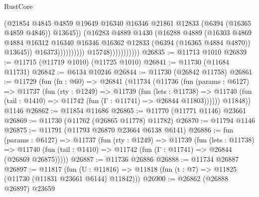 \begin{lexlean}{RustCore}
\begin{coremodule}
                                              (@21854
                                                @4845
                                                @4859
                                                @19649
                                                @16340
                                                @16346
                                                @21861
                                                @12833
                                                (@6394 (@16365 @4859 @4846))
                                                @13645))
                                            (@16283
                                              @4889
                                              @1430
                                              (@16288
                                                @4889
                                                (@16303
                                                  @4869
                                                  @4884
                                                  @16312
                                                  @16340
                                                  @16346
                                                  @16362
                                                  @12833
                                                  (@6394 (@16365 @4884 @4870))
                                                  @13645))
                                              @16373))))))))))
                          @15748)))))))))))
@26835 := @11713 @1010
@26839 := @11715 (@11719 @1010) (@11725 @1010)
@26841 := @11730 (@11684 @11731)
@26842 := @6134 @10246
@26844 := @11730 (@26842 @11758)
@26861 := @11729
    (fun (fn : @60) =>
    @26841
      (@11734
        (@11736
          (fun (params : @6127) =>
          @11737
            (fun (rty : @1249) =>
            @11739
              (fun (lets : @11738) =>
              @11740 (fun (tail : @1410) => @11742 (fun (Γ : @11741) => @26844 @11803))))))
        @11848))
    @1146
@26862 := @11854 @11686
@26865 := @11770 (@11771 @1146) @23661
@26869 := @11730 (@11762 (@26865 @11778) @11782)
@26870 := @11794 @1146
@26875 := @11791 (@11793 @26870 @23664 @6138 @6141)
@26886 := fun (params : @6127) =>
  @11737
    (fun (rty : @1249) =>
    @11739
      (fun (lets : @11738) =>
      @11740 (fun (tail : @1410) => @11742 (fun (Γ : @11741) => @26844 (@26869 @26875)))))
@26887 := @11736 @26886
@26888 := @11734 @26887
@26897 := @11817
    (fun (U : @11816) => @11818 (fun (t : @7) => @11825 (@11730 (@11831 @23661 @6144) @11842)))
@26900 := @26862 (@26888 @26897) @23659

\end{coremodule}
\end{lexlean}
